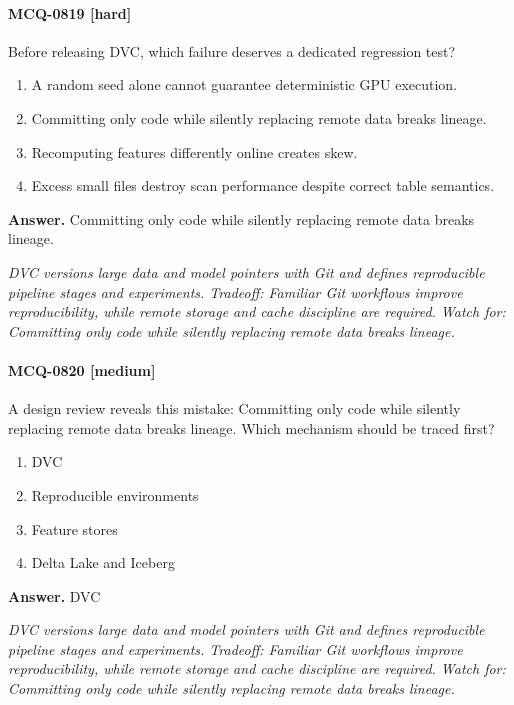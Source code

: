 \paragraph{MCQ-0819 [hard]} Before releasing DVC, which failure deserves a dedicated regression test?
\begin{enumerate}[label=\Alph*.]
\item A random seed alone cannot guarantee deterministic GPU execution.
\item Committing only code while silently replacing remote data breaks lineage.
\item Recomputing features differently online creates skew.
\item Excess small files destroy scan performance despite correct table semantics.
\end{enumerate}
\noindent\textbf{Answer.} Committing only code while silently replacing remote data breaks lineage.
\par\textit{DVC versions large data and model pointers with Git and defines reproducible pipeline stages and experiments. Tradeoff: Familiar Git workflows improve reproducibility, while remote storage and cache discipline are required. Watch for: Committing only code while silently replacing remote data breaks lineage.}
\paragraph{MCQ-0820 [medium]} A design review reveals this mistake: Committing only code while silently replacing remote data breaks lineage. Which mechanism should be traced first?
\begin{enumerate}[label=\Alph*.]
\item DVC
\item Reproducible environments
\item Feature stores
\item Delta Lake and Iceberg
\end{enumerate}
\noindent\textbf{Answer.} DVC
\par\textit{DVC versions large data and model pointers with Git and defines reproducible pipeline stages and experiments. Tradeoff: Familiar Git workflows improve reproducibility, while remote storage and cache discipline are required. Watch for: Committing only code while silently replacing remote data breaks lineage.}
